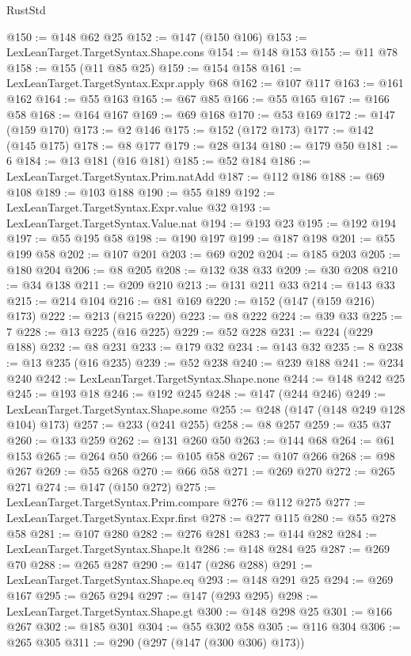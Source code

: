 \begin{lexlean}{RustStd}
\begin{coremodule}
{\begin{coremodule}
{{{{{{{{{{{{{@150 := @148 @62 @25
@152 := @147 (@150 @106)
@153 := LexLeanTarget.TargetSyntax.Shape.cons
@154 := @148 @153
@155 := @11 @78
@158 := @155 (@11 @85 @25)
@159 := @154 @158
@161 := LexLeanTarget.TargetSyntax.Expr.apply @68
@162 := @107 @117
@163 := @161 @162
@164 := @55 @163
@165 := @67 @85
@166 := @55 @165
@167 := @166 @58
@168 := @164 @167
@169 := @69 @168
@170 := @53 @169
@172 := @147 (@159 @170)
@173 := @2 @146
@175 := @152 (@172 @173)
@177 := @142 (@145 @175)
@178 := @8 @177
@179 := @28 @134
@180 := @179 @50
@181 := 6
@184 := @13 @181 (@16 @181)
@185 := @52 @184
@186 := LexLeanTarget.TargetSyntax.Prim.natAdd
@187 := @112 @186
@188 := @69 @108
@189 := @103 @188
@190 := @55 @189
@192 := LexLeanTarget.TargetSyntax.Expr.value @32
@193 := LexLeanTarget.TargetSyntax.Value.nat
@194 := @193 @23
@195 := @192 @194
@197 := @55 @195 @58
@198 := @190 @197
@199 := @187 @198
@201 := @55 @199 @58
@202 := @107 @201
@203 := @69 @202
@204 := @185 @203
@205 := @180 @204
@206 := @8 @205
@208 := @132 @38 @33
@209 := @30 @208
@210 := @34 @138
@211 := @209 @210
@213 := @131 @211 @33
@214 := @143 @33
@215 := @214 @104
@216 := @81 @169
@220 := @152 (@147 (@159 @216) @173)
@222 := @213 (@215 @220)
@223 := @8 @222
@224 := @39 @33
@225 := 7
@228 := @13 @225 (@16 @225)
@229 := @52 @228
@231 := @224 (@229 @188)
@232 := @8 @231
@233 := @179 @32
@234 := @143 @32
@235 := 8
@238 := @13 @235 (@16 @235)
@239 := @52 @238
@240 := @239 @188
@241 := @234 @240
@242 := LexLeanTarget.TargetSyntax.Shape.none
@244 := @148 @242 @25
@245 := @193 @18
@246 := @192 @245
@248 := @147 (@244 @246)
@249 := LexLeanTarget.TargetSyntax.Shape.some
@255 := @248 (@147 (@148 @249 @128 @104) @173)
@257 := @233 (@241 @255)
@258 := @8 @257
@259 := @35 @37
@260 := @133 @259
@262 := @131 @260 @50
@263 := @144 @68
@264 := @61 @153
@265 := @264 @50
@266 := @105 @58
@267 := @107 @266
@268 := @98 @267
@269 := @55 @268
@270 := @66 @58
@271 := @269 @270
@272 := @265 @271
@274 := @147 (@150 @272)
@275 := LexLeanTarget.TargetSyntax.Prim.compare
@276 := @112 @275
@277 := LexLeanTarget.TargetSyntax.Expr.first
@278 := @277 @115
@280 := @55 @278 @58
@281 := @107 @280
@282 := @276 @281
@283 := @144 @282
@284 := LexLeanTarget.TargetSyntax.Shape.lt
@286 := @148 @284 @25
@287 := @269 @70
@288 := @265 @287
@290 := @147 (@286 @288)
@291 := LexLeanTarget.TargetSyntax.Shape.eq
@293 := @148 @291 @25
@294 := @269 @167
@295 := @265 @294
@297 := @147 (@293 @295)
@298 := LexLeanTarget.TargetSyntax.Shape.gt
@300 := @148 @298 @25
@301 := @166 @267
@302 := @185 @301
@304 := @55 @302 @58
@305 := @116 @304
@306 := @265 @305
@311 := @290 (@297 (@147 (@300 @306) @173))
}}}}}}}}}}}}}
\end{coremodule}}
\end{coremodule}
\end{lexlean}
